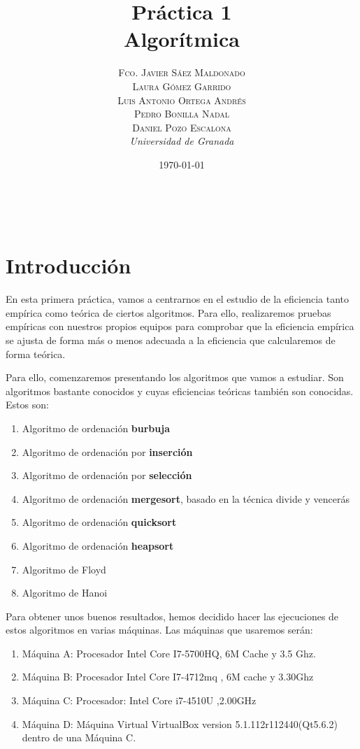 \documentclass[a4paper, 11pt]{article}
\title{\textbf{Práctica 1}\\ %
Algorítmica} %
\author{\textsc{Fco. Javier Sáez Maldonado}\\ %
\textsc{Laura Gómez Garrido}\\
\textsc{Luis Antonio Ortega Andrés}\\
\textsc{Pedro Bonilla Nadal}\\
\textsc{Daniel Pozo Escalona}\vspace{2cm}
\\{\textit{Universidad de Granada}}} %
\date{\today} %
\makeatletter
\renewcommand{\maketitle}{
  \begin{flushright} %
  
  {\LARGE\@title} %
  
  \vspace{50pt} %
  
  {\large\@author} %
  \\\@date %
  \vspace{40pt} %
  \end{flushright}
}
\makeatother
\begin{document}
\maketitle %


{\parskip=2pt
  \tableofcontents
}
\pagebreak



\section*{Introducción}

En esta primera práctica, vamos a centrarnos en el estudio de la eficiencia tanto empírica como teórica de ciertos algoritmos. Para ello, realizaremos pruebas empíricas con nuestros propios equipos para comprobar que la eficiencia empírica se ajusta de forma más o menos adecuada a la eficiencia que calcularemos de forma teórica.

Para ello, comenzaremos presentando los algoritmos que vamos a estudiar. Son algoritmos bastante conocidos y cuyas eficiencias teóricas también son conocidas. Estos son:
\begin{enumerate}
	\item Algoritmo de ordenación \textbf{burbuja}
	\item Algoritmo de ordenación por \textbf{inserción}
	\item Algoritmo de ordenación por \textbf{selección}
	\item Algoritmo de ordenación \textbf{mergesort}, basado en la técnica divide y vencerás
	\item Algoritmo de ordenación \textbf{quicksort}
	\item Algoritmo de ordenación \textbf{heapsort}
	\item Algoritmo de Floyd
	\item Algoritmo de Hanoi
\end{enumerate}

Para obtener unos buenos resultados, hemos decidido hacer las ejecuciones de estos algoritmos en varias máquinas. Las máquinas que usaremos serán:
\begin{enumerate}    
	\item Máquina A: Procesador Intel Core I7-5700HQ, 6M Cache y 3.5 Ghz.
	\item Máquina B: Procesador Intel Core I7-4712mq , 6M cache y 3.30Ghz
	\item Máquina C: Procesador: Intel Core i7-4510U ,2.00GHz
	\item Máquina D: Máquina Virtual VirtualBox version 5.1.112r112440(Qt5.6.2) dentro de una Máquina C.

\end{enumerate}
\end{document}

